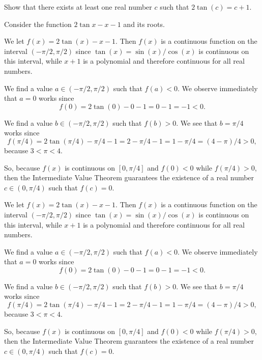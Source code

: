 \begin{question}[2015Q]
Show that there exists at least one real number $c$ such that $2\tan(c)=c+1$.
\end{question}
\begin{hint} Consider the function $2\tan x - x - 1$ and its roots.
\end{hint}
\begin{answer}
We let $f(x)=2\tan(x)-x-1$. Then $f(x)$ is a continuous function on the interval $(-\pi/2, \pi/2)$ since $\tan(x)=\sin(x)/\cos(x)$ is continuous on this interval, while $x+1$ is a polynomial and therefore continuous for all real numbers.

We find a value $a\in (-\pi/2,\pi/2)$ such that $f(a)<0$. We observe immediately that $a=0$ works since
$$f(0)=2\tan(0)-0-1=0-1=-1<0.$$

We find a value $b\in (-\pi/2, \pi/2)$ such that $f(b)>0$. We see that $b=\pi/4$ works since
$$f(\pi/4)=2\tan(\pi/4) -\pi/4 - 1=2-\pi/4 - 1=1-\pi/4=(4-\pi)/4>0,$$
because $3<\pi<4$.

So, because $f(x)$ is continuous on $[0,\pi/4]$ and $f(0)<0$ while $f(\pi/4)>0$, then the Intermediate Value Theorem guarantees the existence of a real number $c\in (0,\pi/4)$ such that $f(c)=0$.

\end{answer}
\begin{solution}
We let $f(x)=2\tan(x)-x-1$. Then $f(x)$ is a continuous function on the interval $(-\pi/2, \pi/2)$ since $\tan(x)=\sin(x)/\cos(x)$ is continuous on this interval, while $x+1$ is a polynomial and therefore continuous for all real numbers.

We find a value $a\in (-\pi/2,\pi/2)$ such that $f(a)<0$. We observe immediately that $a=0$ works since
$$f(0)=2\tan(0)-0-1=0-1=-1<0.$$

We find a value $b\in (-\pi/2, \pi/2)$ such that $f(b)>0$. We see that $b=\pi/4$ works since
$$f(\pi/4)=2\tan(\pi/4) -\pi/4 - 1=2-\pi/4 - 1=1-\pi/4=(4-\pi)/4>0,$$
because $3<\pi<4$.

So, because $f(x)$ is continuous on $[0,\pi/4]$ and $f(0)<0$ while $f(\pi/4)>0$, then the Intermediate Value Theorem guarantees the existence of a real number $c\in (0,\pi/4)$ such that $f(c)=0$.
\end{solution}



